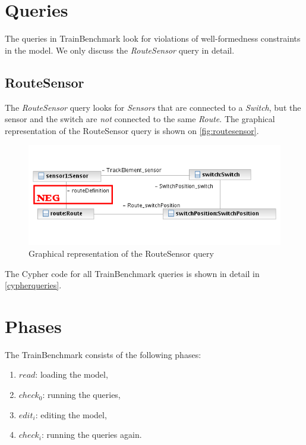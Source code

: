 \section{Queries}

The queries in TrainBenchmark look for violations of well-formedness constraints in the model. We only discuss the \textit{RouteSensor} query in detail.

\subsection{RouteSensor}

The \textit{RouteSensor} query looks for \textit{Sensors} that are connected to a \textit{Switch}, but the sensor and the switch are \textit{not} connected to the same \textit{Route}. The graphical representation of the RouteSensor query is shown on \autoref{fig:routesensor}.

\begin{figure}
\begin{center}
\includegraphics[]{figures/OD_RouteSensor}
\caption{Graphical representation of the RouteSensor query}
\label{fig:routesensor}
\end{center}
\end{figure}

The Cypher code for all TrainBenchmark queries is shown in detail in \autoref{cypherqueries}.

\section{Phases}

The TrainBenchmark consists of the following phases:

\begin{enumerate}
  \item $read$: loading the model,
  \item $check_0$: running the queries,
  \item $edit_i$: editing the model, 
  \item $check_i$: running the queries again.
\end{enumerate}

